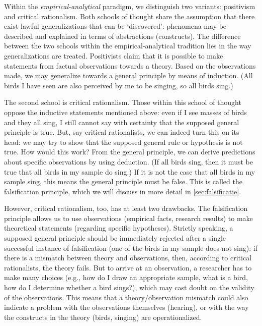 \documentclass[
]{book}
\begin{document}
Within the \emph{empirical-analytical} paradigm, we distinguish two variants: positivism and critical rationalism. Both schools of thought share the assumption that there exist lawful generalizations that can be `discovered': phenomena may be described and explained in terms of abstractions (constructs). The difference between the two schools within the empirical-analytical tradition lies in the way generalizations are treated. Positivists claim that it is possible to make statements from factual observations towards a theory. Based on the observations made, we may generalize towards a general principle by means of induction. (All birds I have seen are also perceived by me to be singing, so all birds sing.)

The second school is critical rationalism. Those within this school of thought oppose the inductive statements mentioned above: even if I see masses of birds and they all sing, I still cannot say with certainty that the supposed general principle is true. But, say critical rationalists, we can indeed turn this on its head: we may try to show that the supposed general rule or hypothesis is not true. How would this work? From the general principle, we can derive predictions about specific observations by using deduction. (If all birds sing, then it must be true that all birds in my sample do sing.) If it is not the case that all birds in my sample sing, this means the general principle must be false. This is called the falsification principle, which we will discuss in more detail in \ref{sec:falsificatie}.

However, critical rationalism, too, has at least two drawbacks. The falsification principle allows us to use observations (empirical facts, research results) to make theoretical statements (regarding specific hypotheses). Strictly speaking, a supposed general principle should be immediately rejected after a single successful instance of falsification (one of the birds in my sample does not sing): if there is a mismatch between theory and observations, then, according to critical rationalists, the theory fails. But to arrive at an observation, a researcher has to make many choices (e.g., how do I draw an appropriate sample, what is a bird, how do I determine whether a bird sings?), which may cast doubt on the validity of the observations. This means that a theory/observation mismatch could also indicate a problem with the observations themselves (hearing), or with the way the constructs in the theory (birds, singing) are operationalized.
\end{document}
